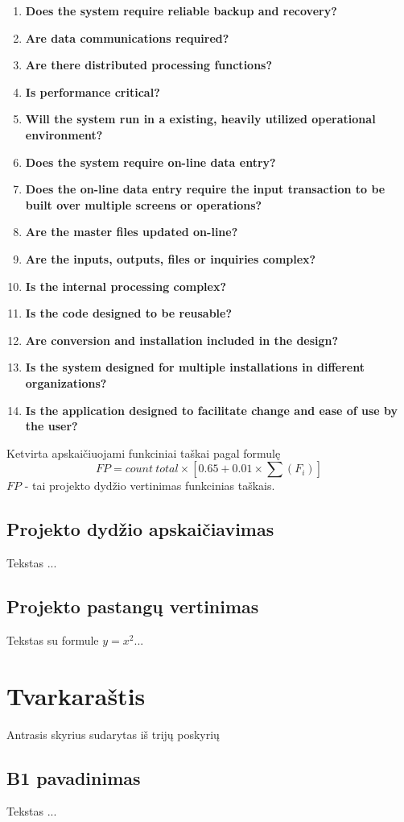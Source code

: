 \documentclass[a4paper,12pt]{article}
\begin{document}
\begin{enumerate}
\item \textbf{Does the system require reliable backup and recovery?}
\item \textbf{Are data communications required?}
\item \textbf{ Are there distributed processing functions?}
\item \textbf{Is performance critical?}
\item \textbf{Will the system run in a existing, heavily utilized operational environment?}
\item \textbf{Does the system require on-line data entry?}
\item \textbf{Does the on-line data entry require the input transaction to be built over multiple screens or operations?}
\item \textbf{Are the master files updated on-line?}
\item \textbf{Are the inputs, outputs, files or inquiries complex?}
\item \textbf{Is the internal processing complex?}
\item \textbf{Is the code designed to be reusable?}
\item \textbf{Are conversion and installation included in the design?}
\item \textbf{Is the system designed for multiple installations in different organizations?}
\item \textbf{Is the application designed to facilitate change and ease of use by the user?}
\end{enumerate}
Ketvirta apskaičiuojami funkciniai taškai pagal formulę
$$ FP = count\ total \times [0.65 + 0.01 \times \sum(F_i)] $$
$FP$ - tai projekto dydžio vertinimas funkcinias taškais.


\subsection{Projekto dydžio apskaičiavimas}
 Tekstas ...
 \subsection{Projekto pastangų vertinimas}
 Tekstas su formule $y=x^2$...
\clearpage 

 \section{ Tvarkaraštis}
Antrasis skyrius sudarytas iš trijų poskyrių
\subsection{B1 pavadinimas}
 Tekstas ...
\end{document}
